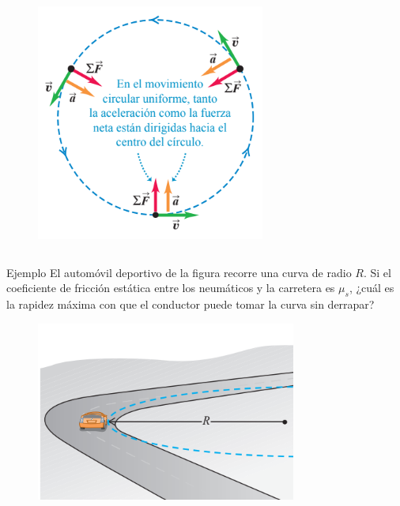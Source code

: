 \begin{frame}
\begin{columns}
\begin{figure}
        \includegraphics[width=\linewidth]{figures/acepta.png}
    \end{figure}
\end{columns}
\end{frame}

\begin{frame}{Ejemplo}
    El automóvil deportivo de la figura recorre una
curva de radio $R$. Si el coeficiente de fricción
estática entre los neumáticos y la carretera es $\mu_s$, ¿cuál es la rapidez
máxima con que el conductor puede tomar la curva sin derrapar?

\begin{figure}
    \centering
    \includegraphics[width=0.45\linewidth]{figures/sin-peralte.png}
\end{figure}

\end{frame}

